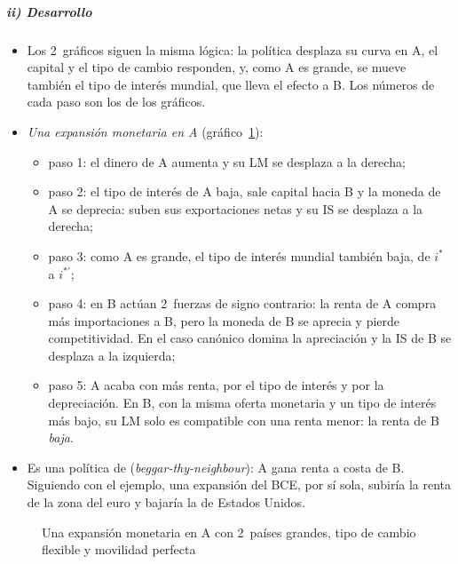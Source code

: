 \documentclass[11pt]{article}
\begin{document}
\subparagraph{ii) Desarrollo}
\begin{itemize}
\item Los 2~gráficos siguen la misma lógica: la política desplaza su curva en A, el capital y el tipo de cambio responden, y, como A es grande, se mueve también el tipo de interés mundial, que lleva el efecto a B. Los números de cada paso son los de los gráficos.
\item \emph{Una expansión monetaria en A} (gráfico~\ref{fig:mundell-fleming-dos-paises}):
  \begin{itemize}
  \item paso 1: el dinero de A aumenta y su LM se desplaza a la derecha;
  \item paso 2: el tipo de interés de A baja, sale capital hacia B y la moneda de A se deprecia: suben sus exportaciones netas y su IS se desplaza a la derecha;
  \item paso 3: como A es grande, el tipo de interés mundial también baja, de $i^*$ a $i^{*\prime}$;
  \item paso 4: en B actúan 2~fuerzas de signo contrario: la renta de A compra más importaciones a B, pero la moneda de B se aprecia y pierde competitividad. En el caso canónico domina la apreciación y la IS de B se desplaza a la izquierda;
  \item paso 5: A acaba con más renta, por el tipo de interés y por la depreciación. En B, con la misma oferta monetaria y un tipo de interés más bajo, su LM solo es compatible con una renta menor: la renta de B \emph{baja}.
  \end{itemize}
\item Es una política de  (\emph{beggar-thy-neighbour}): A gana renta a costa de B\nocite{Mundell1964Reply}. Siguiendo con el ejemplo, una expansión del BCE, por sí sola, subiría la renta de la zona del euro y bajaría la de Estados Unidos.
\end{itemize}

\begin{figure}[H]
\centering
\caption{Una expansión monetaria en A con 2~países grandes, tipo de cambio flexible y movilidad perfecta}\label{fig:mundell-fleming-dos-paises}
\end{figure}
\end{document}
